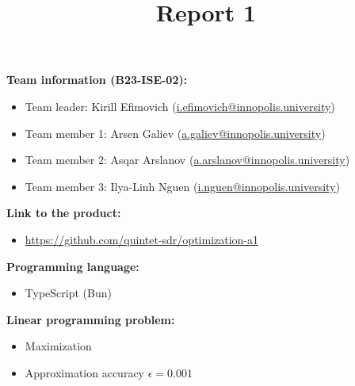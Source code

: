 \documentclass{article}
\title{\textbf{Report 1}}
\author{}
\date{}
\begin{document}
\maketitle

\thispagestyle{fancy}

\textbf{Team information (B23-ISE-02):}
\begin{itemize}[label=-]
    \item Team leader: Kirill Efimovich (\href{mailto:k.efimovich@innopolis.university}{i.efimovich@innopolis.university})
    \item Team member 1: Arsen Galiev (\href{mailto:a.galiev@innopolis.university}{a.galiev@innopolis.university})
    \item Team member 2: Asqar Arslanov (\href{mailto:a.arslanov@innopolis.university}{a.arslanov@innopolis.university})
    \item Team member 3: Ilya-Linh Nguen (\href{mailto:i.nguen@innopolis.university}{i.nguen@innopolis.university})
\end{itemize}

\textbf{Link to the product:}
\begin{itemize}[label=-]
    \item \url{https://github.com/quintet-sdr/optimization-a1}
\end{itemize}

\textbf{Programming language:}
\begin{itemize}[label=-]
    \item TypeScript (Bun)
\end{itemize}

\textbf{Linear programming problem:}
\begin{itemize}[label=-]
    \item Maximization
    \item Approximation accuracy \(\epsilon = 0.001\)
\end{itemize}
\end{document}
